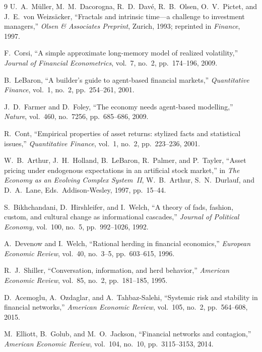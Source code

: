 \documentclass[10pt,twocolumn]{article}
\begin{document}
\begin{thebibliography}{9}
U.~A.~M\"{u}ller, M.~M.~Dacorogna, R.~D.~Dav\'{e}, R.~B.~Olsen,
O.~V.~Pictet, and J.~E.~von Weizs\"{a}cker,
``Fractals and intrinsic time---a challenge to investment managers,''
\textit{Olsen \& Associates Preprint}, Zurich, 1993; reprinted in
\textit{Finance}, 1997.

F.~Corsi, ``A simple approximate long-memory model of realized volatility,''
\textit{Journal of Financial Econometrics}, vol.~7, no.~2,
pp.~174--196, 2009.

B.~LeBaron, ``A builder's guide to agent-based financial markets,''
\textit{Quantitative Finance}, vol.~1, no.~2, pp.~254--261, 2001.

J.~D.~Farmer and D.~Foley, ``The economy needs agent-based modelling,''
\textit{Nature}, vol.~460, no.~7256, pp.~685--686, 2009.

R.~Cont, ``Empirical properties of asset returns: stylized facts and
statistical issues,'' \textit{Quantitative Finance}, vol.~1, no.~2,
pp.~223--236, 2001.

W.~B.~Arthur, J.~H.~Holland, B.~LeBaron, R.~Palmer, and P.~Tayler,
``Asset pricing under endogenous expectations in an artificial stock
market,'' in \textit{The Economy as an Evolving Complex System~II},
W.~B.~Arthur, S.~N.~Durlauf, and D.~A.~Lane, Eds.\ Addison-Wesley,
1997, pp.~15--44.

S.~Bikhchandani, D.~Hirshleifer, and I.~Welch, ``A theory of fads,
fashion, custom, and cultural change as informational cascades,''
\textit{Journal of Political Economy}, vol.~100, no.~5,
pp.~992--1026, 1992.

A.~Devenow and I.~Welch, ``Rational herding in financial economics,''
\textit{European Economic Review}, vol.~40, no.~3--5, pp.~603--615, 1996.

R.~J.~Shiller, ``Conversation, information, and herd behavior,''
\textit{American Economic Review}, vol.~85, no.~2, pp.~181--185, 1995.

D.~Acemoglu, A.~Ozdaglar, and A.~Tahbaz-Salehi, ``Systemic risk and
stability in financial networks,'' \textit{American Economic Review},
vol.~105, no.~2, pp.~564--608, 2015.

M.~Elliott, B.~Golub, and M.~O.~Jackson, ``Financial networks and
contagion,'' \textit{American Economic Review}, vol.~104, no.~10,
pp.~3115--3153, 2014.


\end{thebibliography}
\end{document}
